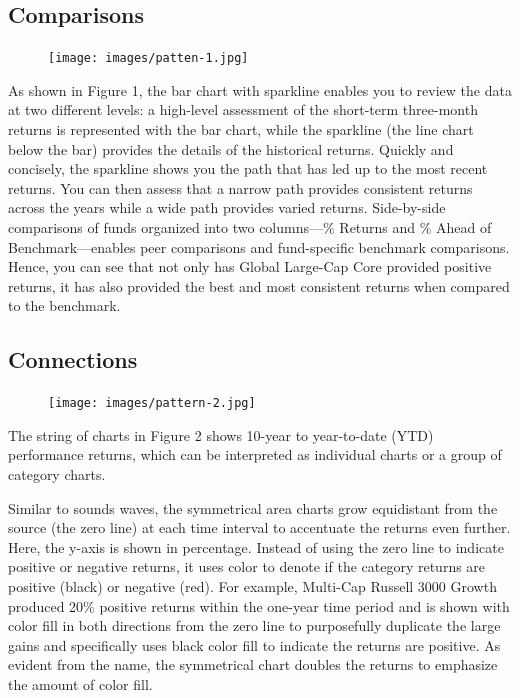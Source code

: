 \documentclass[]{book}
\begin{document}
\subsection{Comparisons}\label{comparisons}

\begin{figure}
\centering
\texttt{[image: images/patten-1.jpg]}
\caption{}
\end{figure}

As shown in Figure 1, the bar chart with sparkline enables you to review
the data at two different levels: a high-level assessment of the
short-term three-month returns is represented with the bar chart, while
the sparkline (the line chart below the bar) provides the details of the
historical returns. Quickly and concisely, the sparkline shows you the
path that has led up to the most recent returns. You can then assess
that a narrow path provides consistent returns across the years while a
wide path provides varied returns. Side-by-side comparisons of funds
organized into two columns---\% Returns and \% Ahead of
Benchmark---enables peer comparisons and fund-specific benchmark
comparisons. Hence, you can see that not only has Global Large-Cap Core
provided positive returns, it has also provided the best and most
consistent returns when compared to the benchmark.

\subsection{Connections}\label{connections}

\begin{figure}
\centering
\texttt{[image: images/pattern-2.jpg]}
\caption{}
\end{figure}

The string of charts in Figure 2 shows 10-year to year-to-date (YTD)
performance returns, which can be interpreted as individual charts or a
group of category charts.

Similar to sounds waves, the symmetrical area charts grow equidistant
from the source (the zero line) at each time interval to accentuate the
returns even further. Here, the y-axis is shown in percentage. Instead
of using the zero line to indicate positive or negative returns, it uses
color to denote if the category returns are positive (black) or negative
(red). For example, Multi-Cap Russell 3000 Growth produced 20\% positive
returns within the one-year time period and is shown with color fill in
both directions from the zero line to purposefully duplicate the large
gains and specifically uses black color fill to indicate the returns are
positive. As evident from the name, the symmetrical chart doubles the
returns to emphasize the amount of color fill.
\end{document}
